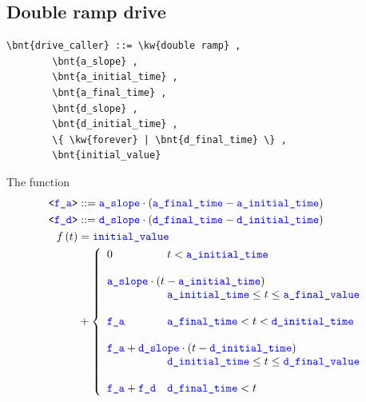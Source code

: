\subsection{Double ramp drive}
\begin{Verbatim}[commandchars=\\\{\}]
    \bnt{drive_caller} ::= \kw{double ramp} ,
        \bnt{a_slope} , 
        \bnt{a_initial_time} , 
        \bnt{a_final_time} , 
        \bnt{d_slope} , 
        \bnt{d_initial_time} , 
        \{ \kw{forever} | \bnt{d_final_time} \} , 
        \bnt{initial_value}
\end{Verbatim}
The function
\begin{align}
	\bnt{f\_a} &::= \nt{a\_slope} \cdot \plbr{\nt{a\_final\_time} - \nt{a\_initial\_time}}
		\nonumber \\
	\bnt{f\_d} &::= \nt{d\_slope} \cdot \plbr{\nt{d\_final\_time} - \nt{d\_initial\_time}}
		\nonumber \\
	f\plbr{t} &= \nt{initial\_value} \\
	&+ \lcubr{\matr{ll}{
		0
			& t < \nt{a\_initial\_time} \\
		\\
		\multicolumn{2}{l}{
		\nt{a\_slope} \cdot \plbr{t - \nt{a\_initial\_time}}
		} \\
			& \nt{a\_initial\_time} \le t \le \nt{a\_final\_value} \\
		\\
		\nt{f\_a}
			& \nt{a\_final\_time} < t < \nt{d\_initial\_time} \\
		\\
		\multicolumn{2}{l}{
		\nt{f\_a}
		+ \nt{d\_slope} \cdot \plbr{t - \nt{d\_initial\_time}}
		} \\
			& \nt{d\_initial\_time} \le t \le \nt{d\_final\_value} \\
		\\
		\nt{f\_a} + \nt{f\_d}
			& \nt{d\_final\_time} < t
	}} \nonumber
\end{align}

